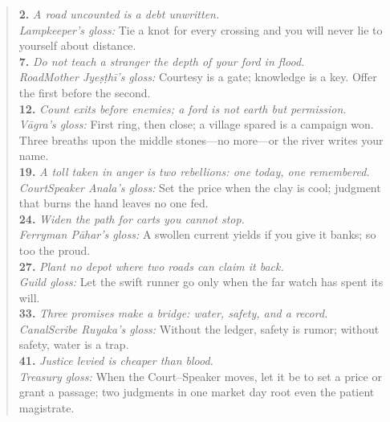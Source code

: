 \documentclass[11pt]{article}
\begin{document}
\begin{quote}\small
\textbf{2.} \emph{A road uncounted is a debt unwritten.}\\
\textit{Lampkeeper's gloss:} Tie a knot for every crossing and you will never lie to yourself about distance.\\[0.35em]

\textbf{7.} \emph{Do not teach a stranger the depth of your ford in flood.}\\
\textit{Road\textendash Mother Jyeṣṭhī's gloss:} Courtesy is a gate; knowledge is a key. Offer the first before the second.\\[0.35em]

\textbf{12.} \emph{Count exits before enemies; a ford is not earth but permission.}\\
\textit{Vāgra's gloss:} First ring, then close; a village spared is a campaign won. Three breaths upon the middle stones---no more---or the river writes your name.\\[0.35em]

\textbf{19.} \emph{A toll taken in anger is two rebellions: one today, one remembered.}\\
\textit{Court\textendash Speaker Anala's gloss:} Set the price when the clay is cool; judgment that burns the hand leaves no one fed.\\[0.35em]

\textbf{24.} \emph{Widen the path for carts you cannot stop.}\\
\textit{Ferryman Pāhar's gloss:} A swollen current yields if you give it banks; so too the proud.\\[0.35em]

\textbf{27.} \emph{Plant no depot where two roads can claim it back.}\\
\textit{Guild gloss:} Let the swift runner go only when the far watch has spent its will.\\[0.35em]

\textbf{33.} \emph{Three promises make a bridge: water, safety, and a record.}\\
\textit{Canal\textendash Scribe Ruyaka's gloss:} Without the ledger, safety is rumor; without safety, water is a trap.\\[0.35em]

\textbf{41.} \emph{Justice levied is cheaper than blood.}\\
\textit{Treasury gloss:} When the Court--Speaker moves, let it be to set a price or grant a passage; two judgments in one market day root even the patient magistrate.\\[0.35em]


\end{quote}
\end{document}
